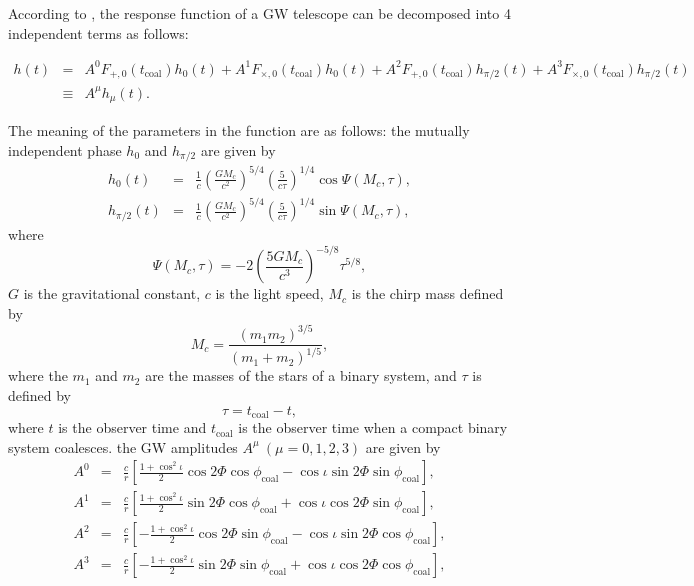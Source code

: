 \documentclass[%
 aps,
 prd,
 amsmath,amssymb,
 reprint,%
superscriptaddress
]{revtex4-1}
\begin{document}
According to \cite{0264-9381-24-23-001}, the response function of a GW telescope can be decomposed into 4 independent terms as follows:
\begin{widetext}
\begin{eqnarray}\label{ken-thesis-eq:16}
 h(t) &=& A^{0}F_{+,0}(t_{\mathrm{coal}})h_{0}(t) + A^{1}F_{\times,0}(t_{\mathrm{coal}})h_{0}(t) + A^{2}F_{+,0}(t_{\mathrm{coal}})h_{\pi/2}(t) + A^{3}F_{\times,0}(t_{\mathrm{coal}})h_{\pi/2}(t)\nonumber\\
 &\equiv& A^{\mu}h_{\mu}(t).
\end{eqnarray}
\end{widetext}
The meaning of the parameters in the function are as follows: the mutually independent phase
$h_{0}$ and
$h_{\pi/2}$ are given by
\begin{eqnarray}
 h_{0}(t) &=& \frac{1}{c}\left(\frac{G M_{c}}{c^{2}}\right)^{5/4}\left(\frac{5}{c \tau}\right)^{1/4}\cos\Psi (M_{c}, \tau),\label{ken-thesis-eq:17}\\
 h_{\pi/2}(t) &=& \frac{1}{c}\left(\frac{G M_{c}}{c^{2}}\right)^{5/4}\left(\frac{5}{c \tau}\right)^{1/4}\sin\Psi (M_{c}, \tau),
\end{eqnarray}
where 
\begin{equation}\label{ken-short_thesis-eq:4}
 \Psi (M_{c}, \tau) = -2\left(\frac{5GM_{c}}{c^{3}}\right)^{-5/8}\tau^{5/8},
\end{equation}
$G$ is the gravitational constant,
$c$ is the light speed,
$M_{c}$ is the chirp mass defined by
\begin{equation}\label{ken-thesis-eq:5}
 M_{c} = \frac{(m_{1}m_{2})^{3/5}}{(m_{1}+m_{2})^{1/5}},
\end{equation}
where the
$m_{1}$ and
$m_{2}$ are the masses of the stars of a binary system, and
$\tau$ is defined by
\begin{equation}\label{ken-thesis-eq:3}
 \tau = t_{\mathrm{coal}}-t,
\end{equation}
where
$t$ is the observer time and
$t_{\mathrm{coal}}$ is the observer time when a compact binary system coalesces. the GW amplitudes
$A^{\mu}\ (\mu=0,1,2,3)$ are given by
\begin{eqnarray*}
 A^{0} &=& \frac{c}{r}\left[\frac{1+\cos^{2}\iota}{2}\cos 2\Phi \cos\phi_{\mathrm{coal}} \allowbreak- \cos\iota\sin 2\Phi\sin\phi_{\mathrm{coal}}\right],\label{ken-thesais-eq:18}\\
 A^{1} &=& \frac{c}{r}\left[\frac{1+\cos^{2}\iota}{2}\sin 2\Phi \cos\phi_{\mathrm{coal}} + \cos\iota\cos 2\Phi\sin\phi_{\mathrm{coal}}\right],\label{ken-thesis-eq:19}\\
 A^{2} &=& \frac{c}{r}\left[-\frac{1+\cos^{2}\iota}{2}\cos 2\Phi \sin\phi_{\mathrm{coal}} - \cos\iota\sin 2\Phi\cos\phi_{\mathrm{coal}}\right],\label{ken-thesis-eq:20}\\
 A^{3} &=& \frac{c}{r}\left[-\frac{1+\cos^{2}\iota}{2}\sin 2\Phi \sin\phi_{\mathrm{coal}} + \cos\iota\cos 2\Phi\cos\phi_{\mathrm{coal}}\right],\label{ken-thesis-eq:21}
\end{eqnarray*}
\end{document}
